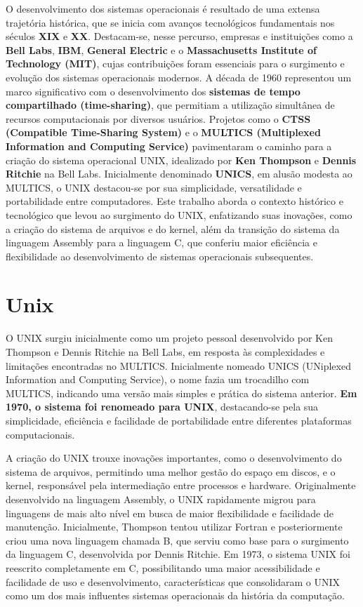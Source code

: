 \documentclass[12pt,oneside,a4paper]{abntex2}
\begin{document}
O desenvolvimento dos sistemas operacionais é resultado de uma extensa trajetória histórica, que se inicia com avanços tecnológicos fundamentais nos séculos \textbf{XIX} e \textbf{XX}. Destacam-se, nesse percurso, empresas e instituições como a \textbf{Bell Labs}, \textbf{IBM}, \textbf{General Electric} e o \textbf{Massachusetts Institute of Technology (MIT)}, cujas contribuições foram essenciais para o surgimento e evolução dos sistemas operacionais modernos. A década de 1960 representou um marco significativo com o desenvolvimento dos \textbf{sistemas de tempo compartilhado (time-sharing)}, que permitiam a utilização simultânea de recursos computacionais por diversos usuários. Projetos como o \textbf{CTSS (Compatible Time-Sharing System)} e o \textbf{MULTICS (Multiplexed Information and Computing Service)} pavimentaram o caminho para a criação do sistema operacional UNIX, idealizado por \textbf{Ken Thompson} e \textbf{Dennis Ritchie} na Bell Labs. Inicialmente denominado \textbf{UNICS}, em alusão modesta ao MULTICS, o UNIX destacou-se por sua simplicidade, versatilidade e portabilidade entre computadores. Este trabalho aborda o contexto histórico e tecnológico que levou ao surgimento do UNIX, enfatizando suas inovações, como a criação do sistema de arquivos e do kernel, além da transição do sistema da linguagem Assembly para a linguagem C, que conferiu maior eficiência e flexibilidade ao desenvolvimento de sistemas operacionais subsequentes.

\section{Unix}

O UNIX surgiu inicialmente como um projeto pessoal desenvolvido por Ken Thompson e Dennis Ritchie na Bell Labs, em resposta às complexidades e limitações encontradas no MULTICS. Inicialmente nomeado UNICS (UNiplexed Information and Computing Service), o nome fazia um trocadilho com MULTICS, indicando uma versão mais simples e prática do sistema anterior. \textbf{Em 1970, o sistema foi renomeado para UNIX}, destacando-se pela sua simplicidade, eficiência e facilidade de portabilidade entre diferentes plataformas computacionais.

A criação do UNIX trouxe inovações importantes, como o desenvolvimento do sistema de arquivos, permitindo uma melhor gestão do espaço em discos, e o kernel, responsável pela intermediação entre processos e hardware. Originalmente desenvolvido na linguagem Assembly, o UNIX rapidamente migrou para linguagens de mais alto nível em busca de maior flexibilidade e facilidade de manutenção. Inicialmente, Thompson tentou utilizar Fortran e posteriormente criou uma nova linguagem chamada B, que serviu como base para o surgimento da linguagem C, desenvolvida por Dennis Ritchie. Em 1973, o sistema UNIX foi reescrito completamente em C, possibilitando uma maior acessibilidade e facilidade de uso e desenvolvimento, características que consolidaram o UNIX como um dos mais influentes sistemas operacionais da história da computação.
\end{document}
